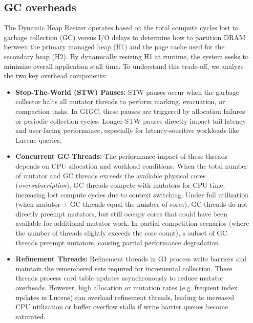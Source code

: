 \subsection{GC overheads}
The Dynamic Heap Resizer operates based on the total compute cycles lost to garbage collection (GC) versus I/O delays to determine how to partition DRAM between the primary managed heap (H1) and the page cache used for the secondary heap (H2). By dynamically resizing H1 at runtime, the system seeks to minimize overall application stall time. To understand this trade-off, we analyze the two key overhead components:
\begin{itemize}
\item \textbf{Stop-The-World (STW) Pauses:}
STW pauses occur when the garbage collector halts all mutator threads to perform marking, evacuation, or compaction tasks. In G1GC, these pauses are triggered by allocation failures or periodic collection cycles. Longer STW pauses directly impact tail latency and user-facing performance, especially for latency-sensitive workloads like Lucene queries.

\item \textbf{Concurrent GC Threads:}
The performance impact of these threads depends on CPU allocation and workload conditions. When the total number of mutator and GC threads exceeds the available physical cores (\textit{oversubscription}), GC threads compete with mutators for CPU time, increasing lost compute cycles due to context switching. Under full utilization (when mutator + GC threads equal the number of cores), GC threads do not directly preempt mutators, but still occupy cores that could have been available for additional mutator work. In partial competition scenarios (where the number of threads slightly exceeds the core count), a subset of GC threads preempt mutators, causing partial performance degradation.

\item \textbf{Refinement Threads:}
Refinement threads in G1 process write barriers and maintain the remembered sets required for incremental collection. These threads process card table updates asynchronously to reduce mutator overheads. However, high allocation or mutation rates (e.g. frequent index updates in Lucene) can overload refinement threads, leading to increased CPU utilization or buffer overflow stalls if write barrier queues become saturated.
\end{itemize}

